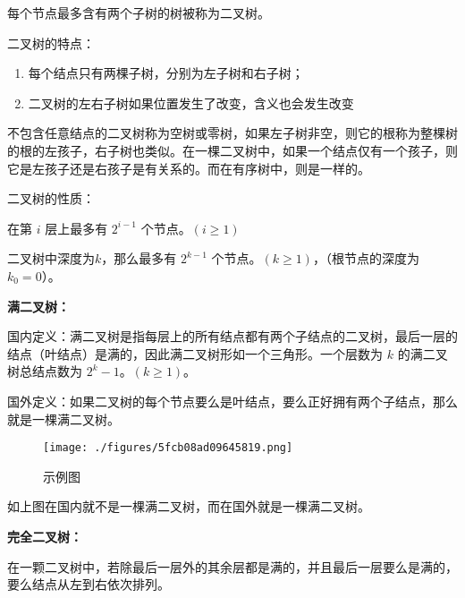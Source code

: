 
每个节点最多含有两个子树的树被称为二叉树。

二叉树的特点：

\begin{enumerate}
\item 每个结点只有两棵子树，分别为左子树和右子树；
\item 二叉树的左右子树如果位置发生了改变，含义也会发生改变
\end{enumerate}

不包含任意结点的二叉树称为空树或零树，如果左子树非空，则它的根称为整棵树的根的左孩子，右子树也类似。在一棵二叉树中，如果一个结点仅有一个孩子，则它是左孩子还是右孩子是有关系的。而在有序树中，则是一样的。

二叉树的性质：

在第 $i$ 层上最多有 $2 ^ {i - 1}$ 个节点。$(i\geq1)$

二叉树中深度为$k$，那么最多有 $2 ^ {k - 1}$ 个节点。$(k\geq1)$，（根节点的深度为 $k_0 = 0$）。

\textbf{满二叉树：}

国内定义：满二叉树是指每层上的所有结点都有两个子结点的二叉树，最后一层的结点（叶结点）是满的，因此满二叉树形如一个三角形。一个层数为 $k$ 的满二叉树总结点数为 $2^k - 1$。$(k\geq1)$。

国外定义：如果二叉树的每个节点要么是叶结点，要么正好拥有两个子结点，那么就是一棵满二叉树。

\begin{figure}[ht]
\centering
\texttt{[image: ./figures/5fcb08ad09645819.png]}
\caption{示例图} \label{fig_tree_2}
\end{figure}

如上图在国内就不是一棵满二叉树，而在国外就是一棵满二叉树。

\textbf{完全二叉树：}

在一颗二叉树中，若除最后一层外的其余层都是满的，并且最后一层要么是满的，要么结点从左到右依次排列。